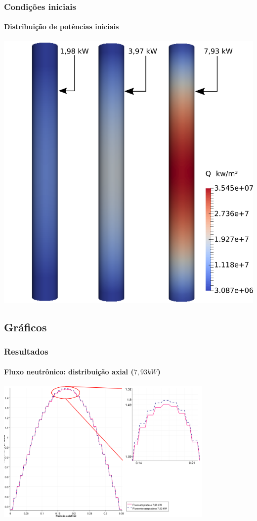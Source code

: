 \documentclass[svgnames,smaller,table]{beamer}
\begin{document}
\begin{frame}
  \frametitle{Condições iniciais}
  \framesubtitle{Distribuição de potências iniciais}
  \centering\includegraphics[scale=0.4]{../figuras/Q_fuel_all_NC.png}
\end{frame}

\subsection{Gráficos}
\begin{frame}
  \frametitle{Resultados}
  \framesubtitle{Fluxo neutrônico: distribuição axial ($7,93 kW$)}
  \centering\includegraphics[width=\textwidth, height=7.0cm]{../figuras/Flux_rel_z_200_port_trabalhado.png}
  \label{fig:flux200z}
\end{frame}
\end{document}
